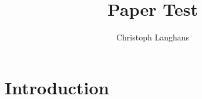 \documentclass{article}
\title{Paper Test}
\author{Christoph Langhans}
\begin{document}
\maketitle

\section{Introduction}
\end{document}
